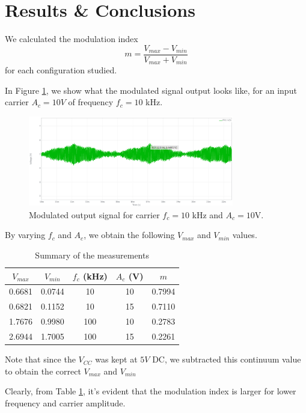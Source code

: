 \documentclass{article}
\begin{document}
	\section*{Results \& Conclusions}
	We calculated the modulation index $$m = \frac{V_{max} - V_{min}}{V_{max} + V_{min}}$$ for each configuration studied.
	
	In Figure \ref{fig:example}, we show what the modulated signal output looks like, for an input carrier $A_c = 10V$ of frequency $f_c = 10$ kHz.
	
	\begin{figure}[h!]
		\centering
		\includegraphics[width=0.8\textwidth]{example_mod}
		\caption{Modulated output signal for carrier $f_{c} = 10$ kHz and $A_c = 10$V.}
		\label{fig:example}
	\end{figure}

	By varying $f_c$ and $A_c$, we obtain the following $V_{max}$ and $V_{min}$ values.
	
	\begin{table}[!h]
		\centering
		\begin{tabular}{|c|c|c|c|c|}
			\hline
			$V_{max}  $           & $V_{min}$              & $f_c$ (kHz) 
			& $A_c$ (V) & $m$                   \\
			\hline
			0.6681 & 0.0744 & 10         & 10       & 0.7994  \\
			0.6821 & 0.1152 & 10         & 15       & 0.7110  \\
			1.7676 & 0.9980  & 100        & 10       & 0.2783 \\
			2.6944             & 1.7005              & 100        & 15       & 0.2261\\
			\hline
		\end{tabular}
		\caption{Summary of the measurements}
		\label{table}
	\end{table}

Note that since the $V_{CC}$ was kept at $5V$ DC, we subtracted this continuum value to obtain the correct $V_{max}$ and $V_{min}$\\ \noindent

Clearly, from Table \ref{table}, it's evident that the modulation index is larger for lower frequency and carrier amplitude.
 
\end{document}
